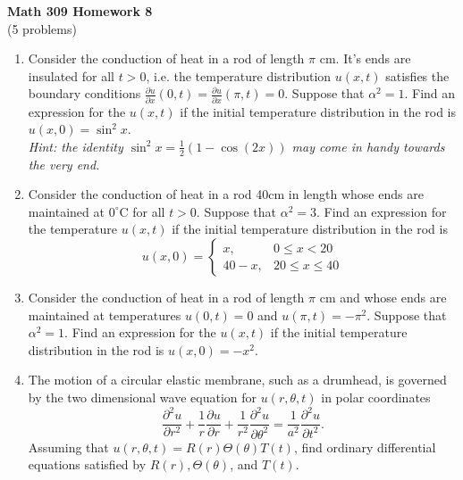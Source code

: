 \documentclass[11pt]{article}
\theoremstyle{definition}
\begin{document}
\begin{center}
\textbf{Math 309 Homework 8}\\
(5 problems)
\end{center}



\begin{enumerate}[leftmargin=*]
\item Consider the conduction of heat in a rod of length $\pi$ cm.  It's ends are insulated for all $t>0$, i.e. the temperature distribution $u(x,t)$ satisfies the boundary conditions $\frac{\partial u}{\partial x}(0, t)=\frac{\partial u}{\partial x}(\pi, t)=0$.  Suppose that $\alpha^2=1$.   Find an expression for the $u(x,t)$ if the initial temperature distribution in the rod is $u(x,0)=\sin^2x$.  \\
\emph{Hint: the identity $\sin^2x=\frac{1}{2}(1-\cos (2x))$ may come in handy towards the very end. } \\


\item Consider the conduction of heat in a rod 40cm in length whose ends are maintained at $0^{\circ}$C for all $t>0$.  Suppose that $\alpha^2=3$.  Find an expression for the temperature $u(x,t)$ if the initial temperature distribution in the rod is 
\[
u(x,0)=\left\{ \begin{array}{ll}
x, &  0\leq x< 20\\
40-x, & 20\leq x\leq 40
\end{array}\right. 
\] 

\item Consider the conduction of heat in a rod of length $\pi$ cm and whose ends are maintained at temperatures $u(0,t)=0$ and $u(\pi, t)=-\pi^2$.  Suppose that $\alpha^2=1$.   Find an expression for the $u(x,t)$ if the initial temperature distribution in the rod is $u(x,0)=-x^2$.  \\


\item The motion of a circular elastic membrane, such as a drumhead, is governed by the two dimensional wave equation for $u(r,\theta, t)$ in polar coordinates
\[
 \frac{\partial ^2 u}{\partial r^2} + \frac{1}{r}\frac{\partial u}{\partial r} + \frac{1}{r^2} \frac{\partial ^2 u}{\partial \theta^2} = \frac{1}{a^2}  \frac{\partial ^2 u}{\partial t^2}.
 \]
 Assuming that $u(r, \theta, t) = R(r)\Theta(\theta) T(t)$, find ordinary differential equations satisfied by
$R(r), \Theta(\theta)$, and $T(t).$\\


\end{enumerate}
\end{document}

